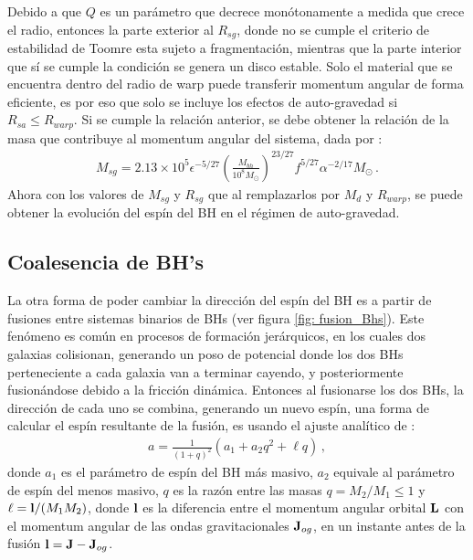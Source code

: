 %
Debido a que $Q$ es un parámetro que decrece monótonamente a medida que crece el radio, entonces la parte exterior al $R_{sg}$, donde no se cumple el criterio de estabilidad de Toomre esta sujeto a fragmentación, mientras que la parte interior que sí se cumple la condición se genera un disco estable. Solo el material que se encuentra dentro del radio de warp puede transferir momentum angular de forma eficiente, es por eso que solo se incluye los efectos de auto-gravedad si $R_{sa}\leq R_{warp}$. Si se cumple la relación anterior, se debe obtener la relación de la masa que contribuye al momentum angular del sistema, dada por \cite{fanidakis2011}:
%
\begin{align}
    M_{sg} = 2.13\times 10^{5}\epsilon^{-5/27}\left(\frac{M_{bh}}{10^{8}M_{\odot}} \right)^{23/27}f^{5/27}\alpha^{-2/17}M_{\odot}\,.
\end{align}
%
Ahora con los valores de $M_{sg}$ y $R_{sg}$ que al remplazarlos por $M_{d}$ y $R_{warp}$, se puede obtener la evolución del espín del BH en el régimen de auto-gravedad.


\subsection{Coalesencia de BH's}
\label{subsec:fusion_BHs}
La otra forma de poder cambiar la dirección del espín del BH es a partir de fusiones entre  sistemas binarios de BHs (ver figura \ref{fig: fusion_Bhs}). Este fenómeno es común en procesos de formación jerárquicos, en los cuales dos galaxias colisionan, generando un poso de potencial donde los dos BHs perteneciente a cada galaxia van a terminar cayendo, y posteriormente fusionándose debido a la fricción dinámica. Entonces al fusionarse los dos BHs, la dirección de cada uno se combina, generando un nuevo espín, una forma de calcular el espín resultante de la fusión, es usando el ajuste analítico de \cite{rezzolla2008}: 
%
\begin{align}
    a = \frac{1}{(1+q)^{2}}(a_{1}+a_{2}q^{2}+\ell q)\,,
\end{align}
%
donde $a_{1}$ es el parámetro de espín del BH más masivo, $a_{2}$ equivale al parámetro de espín del menos masivo, $q$ es la razón entre las masas $q=M_{2}/M_{1}\leq 1$ y $ {\bf{\ell}} = {\bf{l}}/(M_{1}M_{2})$, donde ${\bf{l}}$ es la diferencia entre el momentum angular orbital ${\bf{L}}$ con el momentum angular de las ondas gravitacionales ${\bf{J}}_{og}$, en un instante antes de la fusión ${\bf{l}}={\bf{J}}-{\bf{J}}_{og}$.

